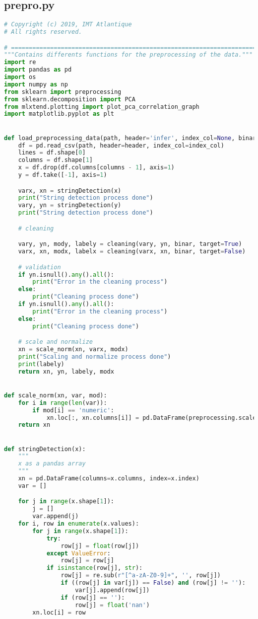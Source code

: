 \documentclass[11pt,a4paper]{article}
\begin{document}
\subsection{prepro.py}
\begin{lstlisting}[language=Python,basicstyle=\tiny]
# Copyright (c) 2019, IMT Atlantique
# All rights reserved.

# ==============================================================================
"""Contains differents functions for the preprocessing of the data."""
import re
import pandas as pd
import os
import numpy as np
from sklearn import preprocessing
from sklearn.decomposition import PCA
from mlxtend.plotting import plot_pca_correlation_graph
import matplotlib.pyplot as plt


def load_preprocessing_data(path, header='infer', index_col=None, binar=False):
    df = pd.read_csv(path, header=header, index_col=index_col)
    lines = df.shape[0]
    columns = df.shape[1]
    x = df.drop(df.columns[columns - 1], axis=1)
    y = df.take([-1], axis=1)

    varx, xn = stringDetection(x)
    print("String detection process done")
    vary, yn = stringDetection(y)
    print("String detection process done")

    # cleaning

    vary, yn, mody, labely = cleaning(vary, yn, binar, target=True)
    varx, xn, modx, labelx = cleaning(varx, xn, binar, target=False)

    # validation
    if yn.isnull().any().all():
        print("Error in the cleaning process")
    else:
        print("Cleaning process done")
    if yn.isnull().any().all():
        print("Error in the cleaning process")
    else:
        print("Cleaning process done")

    # scale and normalize
    xn = scale_norm(xn, varx, modx)
    print("Scaling and normalize process done")
    print(labely)
    return xn, yn, labely, modx


def scale_norm(xn, var, mod):
    for i in range(len(var)):
        if mod[i] == 'numeric':
            xn.loc[:, xn.columns[i]] = pd.DataFrame(preprocessing.scale(xn[xn.columns[i]]), columns=[xn.columns[i]])
    return xn


def stringDetection(x):
    """
    x as a pandas array
    """
    xn = pd.DataFrame(columns=x.columns, index=x.index)
    var = []

    for j in range(x.shape[1]):
        j = []
        var.append(j)
    for i, row in enumerate(x.values):
        for j in range(x.shape[1]):
            try:
                row[j] = float(row[j])
            except ValueError:
                row[j] = row[j]
            if isinstance(row[j], str):
                row[j] = re.sub(r"[^a-zA-Z0-9]+", '', row[j])
                if ((row[j] in var[j]) == False) and (row[j] != ''):
                    var[j].append(row[j])
                if (row[j] == ''):
                    row[j] = float('nan')
        xn.loc[i] = row


\end{lstlisting}
\end{document}
